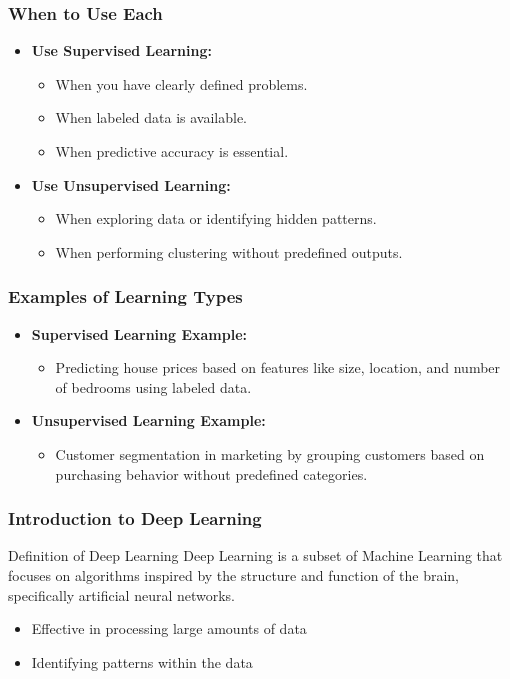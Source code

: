 \documentclass[aspectratio=169]{beamer}
\begin{document}
\begin{frame}[fragile]
    \frametitle{When to Use Each}
    \begin{itemize}
        \item \textbf{Use Supervised Learning:} 
        \begin{itemize}
            \item When you have clearly defined problems.
            \item When labeled data is available.
            \item When predictive accuracy is essential.
        \end{itemize}
        \item \textbf{Use Unsupervised Learning:}
        \begin{itemize}
            \item When exploring data or identifying hidden patterns.
            \item When performing clustering without predefined outputs.
        \end{itemize}
    \end{itemize}
\end{frame}

\begin{frame}[fragile]
    \frametitle{Examples of Learning Types}
    \begin{itemize}
        \item \textbf{Supervised Learning Example:} 
        \begin{itemize}
            \item Predicting house prices based on features like size, location, and number of bedrooms using labeled data.
        \end{itemize}
        \item \textbf{Unsupervised Learning Example:} 
        \begin{itemize}
            \item Customer segmentation in marketing by grouping customers based on purchasing behavior without predefined categories.
        \end{itemize}
    \end{itemize}
\end{frame}

\begin{frame}[fragile]
    \frametitle{Introduction to Deep Learning}
    \begin{block}{Definition of Deep Learning}
        Deep Learning is a subset of Machine Learning that focuses on algorithms inspired by the structure and function of the brain, specifically artificial neural networks. 
    \end{block}
    \begin{itemize}
        \item Effective in processing large amounts of data
        \item Identifying patterns within the data
    \end{itemize}
\end{frame}
\end{document}
